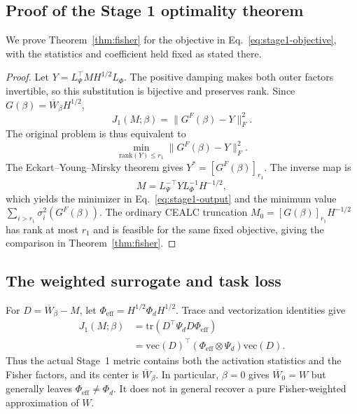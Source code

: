 \subsection{Proof of the Stage 1 optimality theorem}\label{sup:stage1-proof}

We prove Theorem~\ref{thm:fisher} for the objective in Eq.~\eqref{eq:stage1-objective}, with the statistics and coefficient held fixed as stated there.

\begin{proof}
Let $Y=L_\Psi^\top M H^{1/2}L_\Phi$. The positive damping makes both outer factors invertible, so this substitution is bijective and preserves rank. Since $G(\beta)=\overline W_\beta H^{1/2}$,
\begin{equation}
J_1(M;\beta)=\|G^F(\beta)-Y\|_F^2.
\end{equation}
The original problem is thus equivalent to
\begin{equation}
\min_{\mathrm{rank}(Y)\le r_1}\|G^F(\beta)-Y\|_F^2.
\end{equation}
The Eckart--Young--Mirsky theorem gives $Y^*=[G^F(\beta)]_{r_1}$. The inverse map is
\begin{equation}
M=L_\Psi^{-\top}Y L_\Phi^{-1}H^{-1/2},
\end{equation}
which yields the minimizer in Eq.~\eqref{eq:stage1-output} and the minimum value $\sum_{i>r_1}\sigma_i^2(G^F(\beta))$. The ordinary CEALC truncation $M_0=[G(\beta)]_{r_1}H^{-1/2}$ has rank at most $r_1$ and is feasible for the same fixed objective, giving the comparison in Theorem~\ref{thm:fisher}.
\end{proof}

\subsection{The weighted surrogate and task loss}\label{sup:surrogate-interpretation}

For $D=\overline W_\beta-M$, let $\Phi_{\mathrm{eff}}=H^{1/2}\Phi_d H^{1/2}$. Trace and vectorization identities give
\begin{equation}
\begin{aligned}
J_1(M;\beta)
&=\mathrm{tr}(D^\top\Psi_dD\Phi_{\mathrm{eff}}) \\
&=\mathrm{vec}(D)^\top
(\Phi_{\mathrm{eff}}\otimes\Psi_d)\mathrm{vec}(D).
\end{aligned}
\end{equation}
Thus the actual Stage~1 metric contains both the activation statistics and the Fisher factors, and its center is $\overline W_\beta$. In particular, $\beta=0$ gives $\overline W_0=W$ but generally leaves $\Phi_{\mathrm{eff}}\ne\Phi_d$. It does not in general recover a pure Fisher-weighted approximation of $W$.

